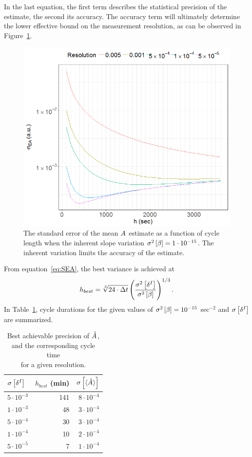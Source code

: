 \documentclass{article}
\newcommand{\Tint}{\Delta t}
\begin{document}
In the last equation, the first term describes the statistical precision of the estimate, the second its accuracy. The accuracy term will ultimately determine the lower effective bound on the measurement resolution, as can be observed in Figure~\ref{fig:SEA_varb}.

\begin{figure}[h]
	\centering
	\includegraphics[scale=.8]{APrec_vs_h_for_resol}
	\caption{The standard error of the mean $\A$ estimate as a function of cycle length when the inherent slope variation $\v{\slp} = 1\cdot10^{-15}$. The inherent variation limits the accuracy of the estimate.\label{fig:SEA_varb}}
\end{figure}

From equation~\eqref{eq:SEA}, the best variance is achieved at
\begin{equation}
h_{best} = \sqrt[3]{24\cdot \Tint} \bkt{\frac{\v{\delta^I}}{\v{\slp}}}^{1/3}.
\end{equation}
In Table~\ref{tbl:SEA_varb}, cycle durations for the given values of $\v{\slp} = 10^{-15}$ sec$^{-2}$ and $\SE{\delta^I}$ are summarized.
\begin{table}[h]
	\centering
	\caption{Best achievable precision of $\A*$,\\ and the corresponding cycle time\\ for a given resolution.\label{tbl:SEA_varb}}
	\begin{tabular}{lrr}
		\hline\hline
		$\SE{\delta^I}$			&	$h_{best}$ (min)	& $\SE{\avg{\A*}}$\\
		\hline
		$5\cdot10^{-3}$		&	141					& $8\cdot10^{-4}$\\
		$1\cdot10^{-3}$		&	48					& $3\cdot10^{-4}$\\
		$5\cdot10^{-4}$		&	30					& $3\cdot10^{-4}$\\
		$1\cdot10^{-4}$		&	10					& $2\cdot10^{-4}$\\
		$5\cdot10^{-5}$		&	7					& $1\cdot10^{-4}$\\
		\hline
	\end{tabular}
\end{table}

	
\end{document}
